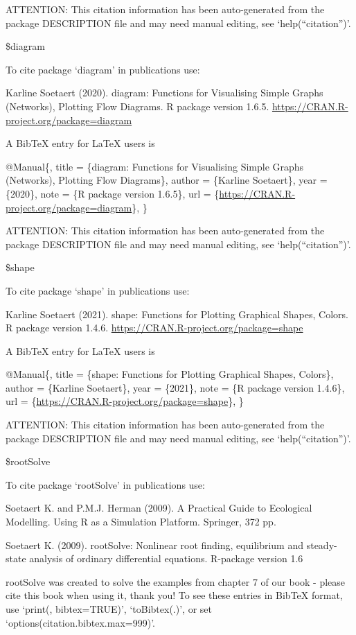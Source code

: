 \documentclass[
]{article}
\begin{document}
ATTENTION: This citation information has been auto-generated from the
package DESCRIPTION file and may need manual editing, see
`help(``citation'')'.

\$diagram

To cite package `diagram' in publications use:

Karline Soetaert (2020). diagram: Functions for Visualising Simple
Graphs (Networks), Plotting Flow Diagrams. R package version 1.6.5.
\url{https://CRAN.R-project.org/package=diagram}

A BibTeX entry for LaTeX users is

@Manual\{, title = \{diagram: Functions for Visualising Simple Graphs
(Networks), Plotting Flow Diagrams\}, author = \{Karline Soetaert\},
year = \{2020\}, note = \{R package version 1.6.5\}, url =
\{\url{https://CRAN.R-project.org/package=diagram}\}, \}

ATTENTION: This citation information has been auto-generated from the
package DESCRIPTION file and may need manual editing, see
`help(``citation'')'.

\$shape

To cite package `shape' in publications use:

Karline Soetaert (2021). shape: Functions for Plotting Graphical Shapes,
Colors. R package version 1.4.6.
\url{https://CRAN.R-project.org/package=shape}

A BibTeX entry for LaTeX users is

@Manual\{, title = \{shape: Functions for Plotting Graphical Shapes,
Colors\}, author = \{Karline Soetaert\}, year = \{2021\}, note = \{R
package version 1.4.6\}, url =
\{\url{https://CRAN.R-project.org/package=shape}\}, \}

ATTENTION: This citation information has been auto-generated from the
package DESCRIPTION file and may need manual editing, see
`help(``citation'')'.

\$rootSolve

To cite package `rootSolve' in publications use:

Soetaert K. and P.M.J. Herman (2009). A Practical Guide to Ecological
Modelling. Using R as a Simulation Platform. Springer, 372 pp.

Soetaert K. (2009). rootSolve: Nonlinear root finding, equilibrium and
steady-state analysis of ordinary differential equations. R-package
version 1.6

rootSolve was created to solve the examples from chapter 7 of our book -
please cite this book when using it, thank you! To see these entries in
BibTeX format, use `print(, bibtex=TRUE)', `toBibtex(.)', or set
`options(citation.bibtex.max=999)'.
\end{document}

